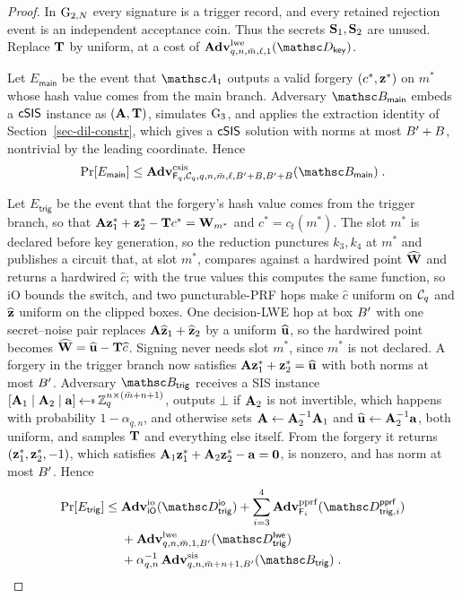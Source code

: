 \begin{proof}
 In $\textnormal{G}_{2,N}$ every signature is a trigger record, and every retained rejection event is an independent acceptance coin. Thus the secrets $\mathbf{S}_1, \mathbf{S}_2$ are unused. Replace $\mathbf{T}$ by uniform, at a cost of $\AdvLWE{q,n,\colsA,\ell,1}{\advD_{\mathsf{key}}}$.

 Let $E_{\mathsf{main}}$ be the event that $\advA_1$ outputs a valid forgery $(c^*, \mathbf{z}^*)$ on $m^*$ whose hash value comes from the main branch. Adversary $\advB_{\mathsf{main}}$ embeds a $\mathsf{cSIS}$ instance as $(\mathbf{A}, \mathbf{T})$, simulates $\textnormal{G}_3$, and applies the extraction identity of Section~\ref{sec-dil-constr}, which gives a $\mathsf{cSIS}$ solution with norms at most $B' + B$, nontrivial by the leading coordinate. Hence
$$
\Pr[E_{\mathsf{main}}]
\le
\AdvCSIS{\Fq_q,\chal_q,q,n,\colsA,\ell,\Bclip+B,\Bclip+B}{\advB_{\mathsf{main}}} \;.
$$

 Let $E_{\mathsf{trig}}$ be the event that the forgery's hash value comes from the trigger branch, so that $\mathbf{A}\mathbf{z}^*_1 + \mathbf{z}^*_2 - \mathbf{T}c^* = \mathbf{W}_{m^*}$ and $c^* = c_t(m^*)$. The slot $m^*$ is declared before key generation, so the reduction punctures $k_3, k_4$ at $m^*$ and publishes a circuit that, at slot $m^*$, compares against a hardwired point $\widehat{\mathbf{W}}$ and returns a hardwired $\widehat{c}$; with the true values this computes the same function, so iO bounds the switch, and two puncturable-PRF hops make $\widehat{c}$ uniform on $\mathcal{C}_q$ and $\widehat{\mathbf{z}}$ uniform on the clipped boxes. One decision-LWE hop at box $B'$ with one secret--noise pair replaces $\mathbf{A}\widehat{\mathbf{z}}_1 + \widehat{\mathbf{z}}_2$ by a uniform $\widehat{\mathbf{u}}$, so the hardwired point becomes $\widehat{\mathbf{W}} = \widehat{\mathbf{u}} - \mathbf{T}\widehat{c}$. Signing never needs slot $m^*$, since $m^*$ is not declared. A forgery in the trigger branch now satisfies $\mathbf{A}\mathbf{z}^*_1 + \mathbf{z}^*_2 = \widehat{\mathbf{u}}$ with both norms at most $B'$. Adversary $\advB_{\mathsf{trig}}$ receives a SIS instance $[\mat{A}_1 \mid \mat{A}_2 \mid \mat{a}] \getsr \Zq^{n\times(\colsA+n+1)}$, outputs $\bot$ if $\mathbf{A}_2$ is not invertible, which happens with probability $1 - \alpha_{q,n}$, and otherwise sets $\mathbf{A} \gets \mathbf{A}_2^{-1}\mathbf{A}_1$ and $\widehat{\mathbf{u}} \gets \mathbf{A}_2^{-1}\mathbf{a}$, both uniform, and samples $\mathbf{T}$ and everything else itself. From the forgery it returns $(\mathbf{z}^*_1, \mathbf{z}^*_2, -1)$, which satisfies $\mathbf{A}_1\mathbf{z}^*_1 + \mathbf{A}_2\mathbf{z}^*_2 - \mathbf{a} = \mathbf{0}$, is nonzero, and has norm at most $B'$. Hence
$$
\begin{aligned}
\Pr[E_{\mathsf{trig}}] \le{}&
\AdvIO{\iO}{\advD^{\mathsf{io}}_{\mathsf{trig}}}
+ \sum_{i=3}^{4}\AdvPPRF{\PRF_i}{\advD^{\mathsf{pprf}}_{\mathsf{trig},i}}\\
&+ \AdvLWE{q,n,\colsA,1,\Bclip}{\advD^{\mathsf{lwe}}_{\mathsf{trig}}}\\
&+ \alpha_{q,n}^{-1}\,\AdvSIS{q,n,\colsA+n+1,\Bclip}{\advB_{\mathsf{trig}}} \;.
\end{aligned}
$$


\end{proof}
